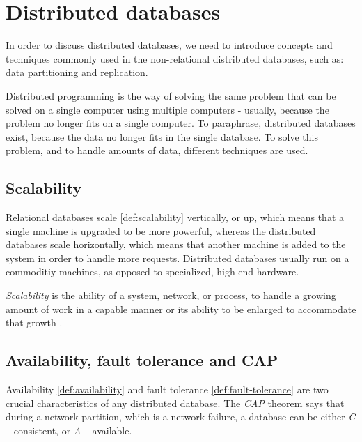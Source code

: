 
\section{Distributed databases}\label{sec:theory:distDbs}
In order to discuss distributed databases, we need to introduce concepts and techniques commonly used in the non-relational distributed databases, such as: data partitioning and replication.

Distributed programming is the way of solving the same problem that can be solved on a single computer using multiple computers - usually, because the problem no longer fits on a single computer. \cite{DistributeSystemsForFunAndProfit} To paraphrase, distributed databases exist, because the data no longer fits in the single database. To solve this problem, and to handle amounts of data, different techniques are used.


\subsection{Scalability}
Relational databases scale \ref{def:scalability} vertically, or up, which means that a single machine is upgraded to be more powerful, whereas the distributed databases scale horizontally, which means that another machine is added to the system in order to handle more requests. Distributed databases usually run on a commoditiy machines, as opposed to specialized, high end hardware.

\begin{definition}
  \label{def:scalability}
  \emph{Scalability} is the ability of a system, network, or process, to handle a growing amount of work in a capable manner or its ability to be enlarged to accommodate that growth \cite{DistributeSystemsForFunAndProfit}. 
\end{definition}


\subsection{Availability, fault tolerance and CAP}
Availability \ref{def:availability} and fault tolerance \ref{def:fault-tolerance} are two crucial characteristics of any distributed database. The \emph{CAP} theorem \cite{brewer2000towards} \cite{Brewer:2012ba} says that during a network partition, which is a network failure, a database can be either \emph{C} -- consistent, or \emph{A} -- available. 

